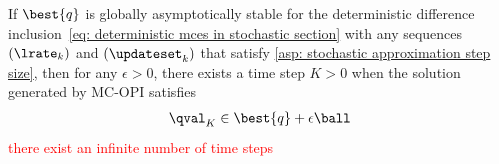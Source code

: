 \begin{lemma}
\label{thm: get epsilon close many times}
    If $\best{q}$ is globally asymptotically stable for the deterministic difference inclusion~\eqref{eq: deterministic mces in stochastic section} with any sequences $(\lrate_k)$ and $(\updateset_k)$ that satisfy \autoref{asp: stochastic approximation step size},
    then 
    for any $\epsilon>0$, there exists a time step $K>0$ when the solution generated by MC-OPI satisfies 
    \begin{align}
        \qval_K \in \best{q} + \epsilon \ball
    \end{align}
    \textcolor{red}{there exist an infinite number of time steps}
\end{lemma}
